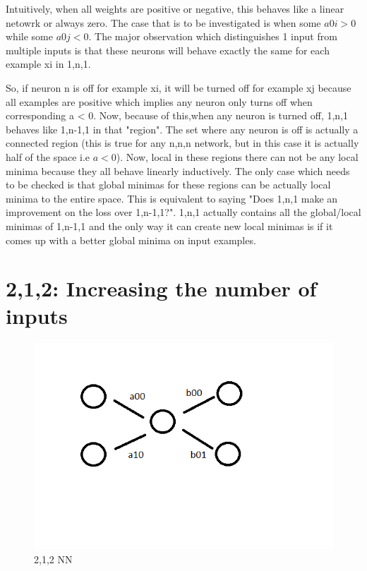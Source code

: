 \documentclass[conference]{IEEEtran}
\begin{document}
Intuitively, when all weights are positive or negative, this behaves like a linear netowrk or always zero. The case that is to be investigated is when some $a0i > 0$ while some $a0j < 0$. The major observation which distinguishes 1 input from multiple inputs is that these neurons will behave exactly the same for each example xi in 1,n,1.

So, if neuron n is off for example xi, it will be turned off for example xj because all examples are positive which implies any neuron only turns off when corresponding a < 0. Now, because of this,when any neuron is turned off, 1,n,1 behaves like 1,n-1,1 in that "region". The set where any neuron is off is actually a connected region (this is true for any n,n,n network, but in this case it is actually half of the space i.e $a < 0$). Now, local in these regions there can not be any local minima because they all behave linearly inductively. The only case which needs to be checked is that global minimas for these regions can be actually local minima to the entire space. This is equivalent to saying "Does 1,n,1 make an improvement on the loss over 1,n-1,1?". 1,n,1 actually contains all the global/local minimas of 1,n-1,1 and the only way it can create new local minimas is if it comes up with a better global minima on input examples.


\section{2,1,2: Increasing the number of inputs}

\begin{figure}
	\includegraphics[width=\linewidth]{images/nn/212.png}
	\caption{2,1,2 NN}
	\label{fig:212}
\end{figure}
\end{document}
